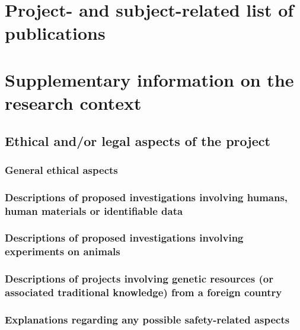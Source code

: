 \documentclass{scrartcl}
\begin{document}
\section{Project- and subject-related list of publications}
\label{sec:bib}


\backmatter
\section{Supplementary information on the research context}

\subsection{Ethical and/or legal aspects of the project}

\subsubsection{General ethical aspects}

\subsubsection{Descriptions of proposed investigations involving humans, human materials or identifiable data}

\subsubsection{Descriptions of proposed investigations involving experiments on animals}

\subsubsection{Descriptions of projects involving genetic resources (or associated traditional knowledge) from a foreign country}

\subsubsection{Explanations regarding any possible safety-related aspects}
\end{document}
